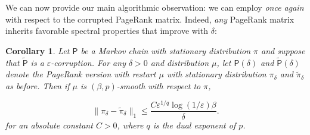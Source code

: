 \documentclass[11pt]{article}
\newtheorem{cor}[thm]{Corollary}
\theoremstyle{remark}
\begin{document}
We can now provide our main algorithmic observation: we can employ  \emph{once again} with respect to the corrupted PageRank matrix. Indeed, \emph{any} PageRank matrix inherits favorable spectral properties that improve with $\delta$:
\begin{cor}
\label{cor:corrupted_close}
    Let $\mathsf{P}$ be a Markov chain with stationary distribution $\pi$ and suppose that $\widetilde{\mathsf{P}}$ is a $\varepsilon$-corruption. For any $\delta>0$ and distribution $\mu$, let $\mathsf{P}(\delta)$ and $\widetilde{\mathsf{P}}(\delta)$ denote the PageRank version with restart $\mu$ with stationary distribution $\pi_{\delta}$ and $\widetilde{\pi}_{\delta}$ as before. Then if $\mu$  is $(\beta,p)$-smooth with respect to $\pi$, 

    \begin{equation*}
        \|\pi_{\delta}-\widetilde{\pi}_{\delta}\|_1\leq \frac{C\varepsilon^{1/q}\log(1/\varepsilon)\beta}{\delta}. 
    \end{equation*}
    for an absolute constant $C>0$, where $q$ is the dual exponent of $p$.

\end{cor}
\end{document}
